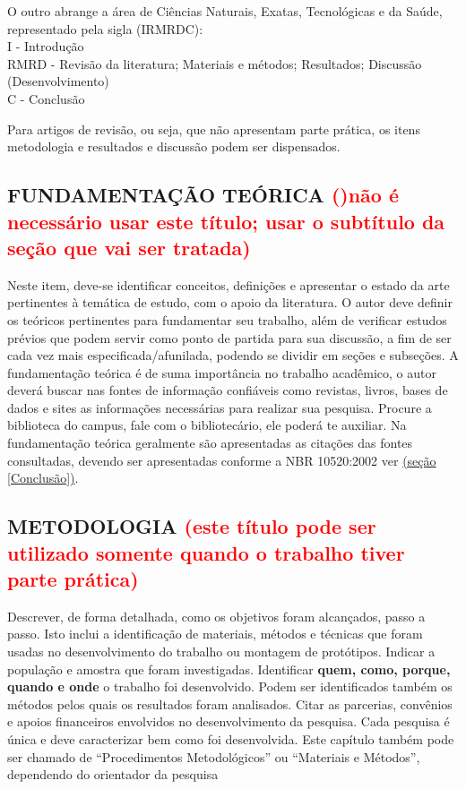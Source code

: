 \documentclass[12pt]{article}
\begin{document}
O outro abrange a área de Ciências Naturais, Exatas, Tecnológicas e da Saúde, representado pela sigla (IRMRDC): 
\\I
- Introdução
\\RMRD
- Revisão da literatura; Materiais e métodos; Resultados; Discussão (Desenvolvimento)
\\C
- Conclusão

Para artigos de revisão, ou seja, que não apresentam parte prática, os itens metodologia e resultados e discussão podem ser dispensados.


\subsection{FUNDAMENTAÇÃO TEÓRICA \textcolor{red}{()não é necessário usar este título; usar o subtítulo da seção que vai ser tratada)}}
\label{fundamentacao}

Neste item, deve-se identificar conceitos, definições e apresentar o estado da arte pertinentes à temática de estudo, com o apoio da literatura. O autor deve definir os teóricos pertinentes para fundamentar seu trabalho, além de verificar estudos prévios que podem servir como ponto de partida para sua discussão, a fim de ser cada vez mais especificada/afunilada, podendo se dividir em seções e subseções.
A fundamentação teórica é de suma importância no trabalho acadêmico, o autor deverá buscar nas fontes de informação confiáveis como revistas, livros, bases de dados e sites as informações necessárias para realizar sua pesquisa. Procure a biblioteca do campus, fale com o bibliotecário, ele poderá te auxiliar.
Na fundamentação teórica geralmente são apresentadas as citações das fontes consultadas, devendo ser apresentadas conforme a NBR 10520:2002 ver \underline{(seção \ref{Conclusão})}. 


\subsection{METODOLOGIA \textcolor{red}{(este título pode ser utilizado somente quando o trabalho tiver parte prática)}}
\label{metodologia}

Descrever, de forma detalhada, como os objetivos foram alcançados, passo a passo. Isto inclui a identificação de materiais, métodos e técnicas que foram usadas no desenvolvimento do trabalho ou montagem de protótipos. Indicar a população e amostra que foram investigadas. Identificar \textbf{quem, como, porque, quando e onde } o trabalho foi desenvolvido. Podem ser identificados também os métodos pelos quais os resultados foram analisados. Citar as parcerias, convênios e apoios financeiros envolvidos no desenvolvimento da pesquisa. Cada pesquisa é única e deve caracterizar bem como foi desenvolvida.
Este capítulo também pode ser chamado de “Procedimentos Metodológicos” ou “Materiais e Métodos”, dependendo do orientador da pesquisa
\end{document}
